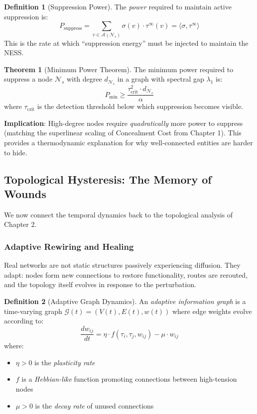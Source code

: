 \documentclass[12pt,a4paper]{article}
\theoremstyle{definition}
\newtheorem{definition}{Definition}[section]
\newtheorem{theorem}{Theorem}[section]
\theoremstyle{remark}
\newcommand{\NS}{\mathcal{N}_s}          %
\newcommand{\CA}{\mathcal{A}}            %
\newcommand{\Graph}{\mathcal{G}}         %
\begin{document}
\begin{definition}[Suppression Power]
The \emph{power} required to maintain active suppression is:
\begin{equation}
    \boxed{
    P_{\text{suppress}} = \sum_{v \in \CA(\NS)} \sigma(v) \cdot \tau^{\infty}(v) = \langle \sigma, \tau^{\infty} \rangle
    }
\end{equation}
This is the rate at which ``suppression energy'' must be injected to maintain the NESS.
\end{definition}

\begin{theorem}[Minimum Power Theorem]
\label{thm:min-power}
The minimum power required to suppress a node $\NS$ with degree $d_{\NS}$ in a graph with spectral gap $\lambda_1$ is:
\begin{equation}
    P_{\min} \geq \frac{\tau_{\text{crit}}^2 \cdot d_{\NS}}{\alpha}
\end{equation}
where $\tau_{\text{crit}}$ is the detection threshold below which suppression becomes visible.
\end{theorem}

\textbf{Implication}: High-degree nodes require \emph{quadratically} more power to suppress (matching the superlinear scaling of Concealment Cost from Chapter 1). This provides a thermodynamic explanation for why well-connected entities are harder to hide.

\subsection{Topological Hysteresis: The Memory of Wounds}

We now connect the temporal dynamics back to the topological analysis of Chapter 2.

\subsubsection{Adaptive Rewiring and Healing}

Real networks are not static structures passively experiencing diffusion. They adapt: nodes form new connections to restore functionality, routes are rerouted, and the topology itself evolves in response to the perturbation.

\begin{definition}[Adaptive Graph Dynamics]
An \emph{adaptive information graph} is a time-varying graph $\Graph(t) = (V(t), E(t), w(t))$ where edge weights evolve according to:
\begin{equation}
    \frac{dw_{ij}}{dt} = \eta \cdot f(\tau_i, \tau_j, w_{ij}) - \mu \cdot w_{ij}
\end{equation}
where:
\begin{itemize}
    \item $\eta > 0$ is the \emph{plasticity rate}
    \item $f$ is a \emph{Hebbian-like} function promoting connections between high-tension nodes
    \item $\mu > 0$ is the \emph{decay rate} of unused connections
\end{itemize}
\end{definition}
\end{document}
